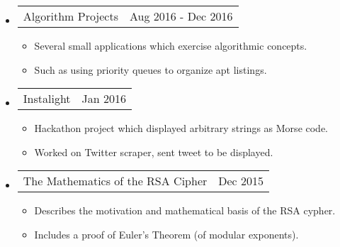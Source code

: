 \documentclass[18pt]{article}
\makeatletter
\providecommand{\tightlist}{
    \setlength{\itemsep}{0pt}\setlength{\parskip}{0pt}
}
\providecommand{\datetable}[2]{
    \begin{tabular*}{\textwidth}{r @{\extracolsep{\fill}} l}
        #1 & #2
    \end{tabular*}
}
\makeatother
\begin{document}
\begin{itemize}
      \item \datetable{Algorithm Projects}{Aug 2016 - Dec 2016}
        \begin{itemize}\tightlist
          \item Several small applications which exercise algorithmic concepts.
          \item Such as using priority queues to organize apt listings.
        \end{itemize}
        
      \item \datetable{Instalight}{Jan 2016}
      \begin{itemize}\tightlist
        \item Hackathon project which displayed arbitrary strings as Morse code.
        \item Worked on Twitter scraper, sent tweet to be displayed.
      \end{itemize}
      
      \item \datetable{The Mathematics of the RSA Cipher}{Dec 2015}
      \begin{itemize}\tightlist
        \item Describes the motivation and mathematical basis of the RSA cypher.
        \item Includes a proof of Euler's Theorem (of modular exponents).
      \end{itemize}
  \end{itemize}
    
\end{document}
